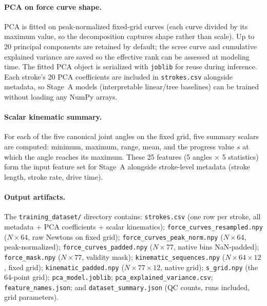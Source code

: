 \documentclass[11pt]{article}
\begin{document}
\paragraph{PCA on force curve shape.}
PCA is fitted on peak-normalized fixed-grid curves (each curve divided by its maximum value, so the decomposition captures shape rather than scale). Up to 20 principal components are retained by default; the scree curve and cumulative explained variance are saved so the effective rank can be assessed at modeling time. The fitted PCA object is serialized with \texttt{joblib} for reuse during inference. Each stroke's 20 PCA coefficients are included in \texttt{strokes.csv} alongside metadata, so Stage~A models (interpretable linear/tree baselines) can be trained without loading any NumPy arrays.

\paragraph{Scalar kinematic summary.}
For each of the five canonical joint angles on the fixed grid, five summary scalars are computed: minimum, maximum, range, mean, and the progress value $s$ at which the angle reaches its maximum. These 25 features (5 angles $\times$ 5 statistics) form the input feature set for Stage~A alongside stroke-level metadata (stroke length, stroke rate, drive time).

\paragraph{Output artifacts.}
The \texttt{training\_dataset/} directory contains: \texttt{strokes.csv} (one row per stroke, all metadata + PCA coefficients + scalar kinematics); \texttt{force\_curves\_resampled.npy} ($N \times 64$, raw Newtons on fixed grid); \texttt{force\_curves\_peak\_norm.npy} ($N \times 64$, peak-normalized); \texttt{force\_curves\_padded.npy} ($N \times 77$, native bins NaN-padded); \texttt{force\_mask.npy} ($N \times 77$, validity mask); \texttt{kinematic\_sequences.npy} ($N \times 64 \times 12$, fixed grid); \texttt{kinematic\_padded.npy} ($N \times 77 \times 12$, native grid); \texttt{s\_grid.npy} (the 64-point grid); \texttt{pca\_model.joblib}; \texttt{pca\_explained\_variance.csv}; \texttt{feature\_names.json}; and \texttt{dataset\_summary.json} (QC counts, runs included, grid parameters).
\end{document}
